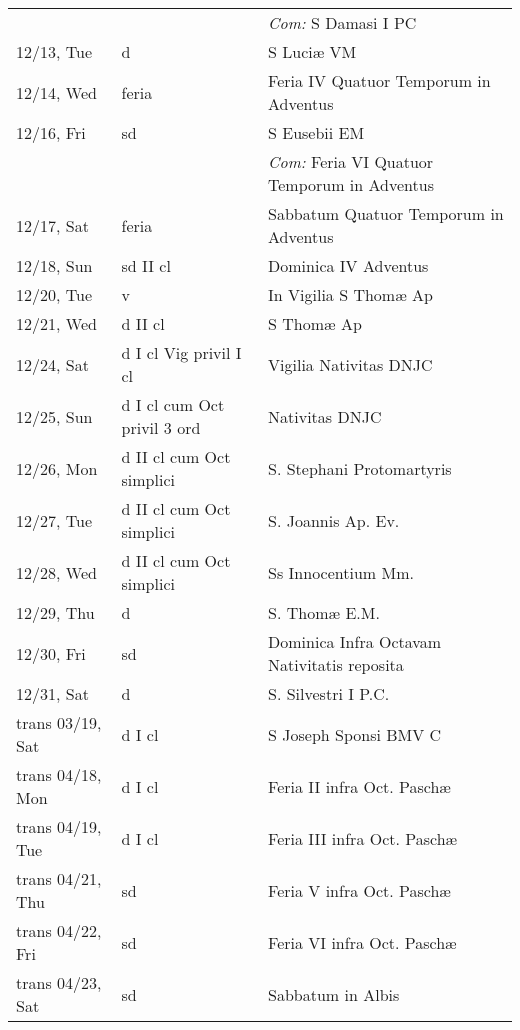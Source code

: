 \documentclass[10pt]{article}
\begin{document}
\begin{longtable}{ l l l }
 & & \textit{Com:} S Damasi I PC\\
12/13, Tue & d & S Luciæ VM\\
12/14, Wed & feria & Feria IV Quatuor Temporum in Adventus\\
12/16, Fri & sd & S Eusebii EM\\
 & & \textit{Com:} Feria VI Quatuor Temporum in Adventus\\
12/17, Sat & feria & Sabbatum Quatuor Temporum in Adventus\\
12/18, Sun & sd II cl & Dominica IV Adventus\\
12/20, Tue & v & In Vigilia S Thomæ Ap\\
12/21, Wed & d II cl & S Thomæ Ap\\
12/24, Sat & d I cl Vig privil I cl & Vigilia Nativitas DNJC\\
12/25, Sun & d I cl cum Oct privil 3 ord & Nativitas DNJC\\
12/26, Mon & d II cl cum Oct simplici & S. Stephani Protomartyris\\
12/27, Tue & d II cl cum Oct simplici & S. Joannis Ap. Ev.\\
12/28, Wed & d II cl cum Oct simplici & Ss Innocentium Mm.\\
12/29, Thu & d & S. Thomæ E.M.\\
12/30, Fri & sd & Dominica Infra Octavam Nativitatis reposita\\
12/31, Sat & d & S. Silvestri I P.C.\\
trans 03/19, Sat & d I cl & S Joseph Sponsi BMV C\\
trans 04/18, Mon & d I cl & Feria II infra Oct. Paschæ\\
trans 04/19, Tue & d I cl & Feria III infra Oct. Paschæ\\
trans 04/21, Thu & sd & Feria V infra Oct. Paschæ\\
trans 04/22, Fri & sd & Feria VI infra Oct. Paschæ\\
trans 04/23, Sat & sd & Sabbatum in Albis\\
\end{longtable}
\end{document}
